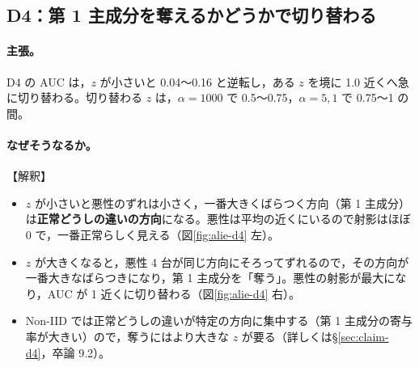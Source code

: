 \documentclass[a4j, dvipdfmx]{jsarticle}  %
\begin{document}
\subsection{D4：第 1 主成分を奪えるかどうかで切り替わる}
\label{sec:claim-alie-d4}

\paragraph{主張。}
D4 の AUC は，$z$ が小さいと 0.04〜0.16 と逆転し，ある $z$ を境に 1.0 近くへ急に切り替わる。切り替わる $z$ は，$\alpha = 1000$ で 0.5〜0.75，$\alpha = 5, 1$ で 0.75〜1 の間。

\paragraph{なぜそうなるか。}【解釈】
\begin{itemize}
  \item $z$ が小さいと悪性のずれは小さく，一番大きくばらつく方向（第 1 主成分）は\textbf{正常どうしの違いの方向}になる。悪性は平均の近くにいるので射影はほぼ 0 で，一番正常らしく見える（図\ref{fig:alie-d4} 左）。
  \item $z$ が大きくなると，悪性 4 台が同じ方向にそろってずれるので，その方向が一番大きなばらつきになり，第 1 主成分を「奪う」。悪性の射影が最大になり，AUC が 1 近くに切り替わる（図\ref{fig:alie-d4} 右）。
  \item Non-IID では正常どうしの違いが特定の方向に集中する（第 1 主成分の寄与率が大きい）ので，奪うにはより大きな $z$ が要る（詳しくは\S\ref{sec:claim-d4}，卒論 9.2）。
\end{itemize}
\end{document}
